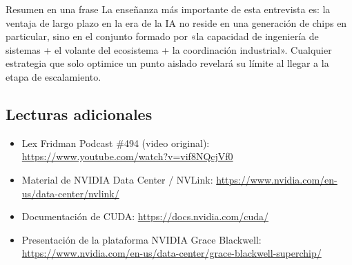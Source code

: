 \begin{importantbox}{Resumen en una frase}
La enseñanza más importante de esta entrevista es: la ventaja de largo plazo en la era de la IA no reside en una generación de chips en particular, sino en el conjunto formado por «la capacidad de ingeniería de sistemas + el volante del ecosistema + la coordinación industrial». Cualquier estrategia que solo optimice un punto aislado revelará su límite al llegar a la etapa de escalamiento.
\end{importantbox}

\subsection{Lecturas adicionales}

\begin{itemize}
    \item Lex Fridman Podcast \#494 (video original): \url{https://www.youtube.com/watch?v=vif8NQcjVf0}
    \item Material de NVIDIA Data Center / NVLink: \url{https://www.nvidia.com/en-us/data-center/nvlink/}
    \item Documentación de CUDA: \url{https://docs.nvidia.com/cuda/}
    \item Presentación de la plataforma NVIDIA Grace Blackwell: \url{https://www.nvidia.com/en-us/data-center/grace-blackwell-superchip/}
\end{itemize}




